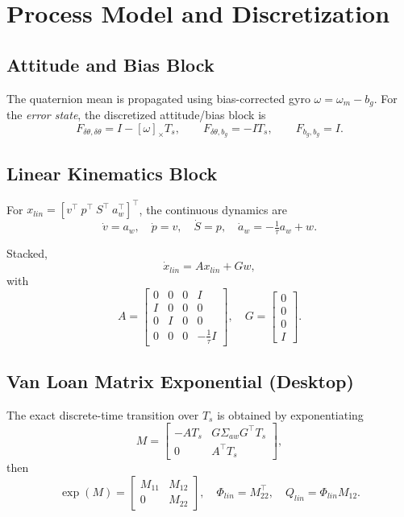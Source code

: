 \documentclass[11pt]{article}
\begin{document}
\section{Process Model and Discretization}

\subsection{Attitude and Bias Block}
The quaternion mean is propagated using bias-corrected gyro $\omega=\omega_m-b_g$.  
For the \emph{error state}, the discretized attitude/bias block is
\[
F_{\delta\theta,\delta\theta} = I - [\omega]_\times T_s,\qquad
F_{\delta\theta,b_g} = -I T_s,\qquad
F_{b_g,b_g}=I.
\]

\subsection{Linear Kinematics Block}
For $x_{lin}=[v^\top\ p^\top\ S^\top\ a_w^\top]^\top$, the continuous dynamics are
\[
\dot v = a_w,\quad \dot p = v,\quad \dot S = p,\quad
\dot a_w = -\tfrac{1}{\tau} a_w + w.
\]

Stacked,
\[
\dot x_{lin} = A x_{lin} + G w,
\]
with
\[
A = \begin{bmatrix}
0 & 0 & 0 & I \\
I & 0 & 0 & 0 \\
0 & I & 0 & 0 \\
0 & 0 & 0 & -\tfrac{1}{\tau} I
\end{bmatrix},\quad
G=\begin{bmatrix}0\\0\\0\\I\end{bmatrix}.
\]

\subsection{Van Loan Matrix Exponential (Desktop)}
The exact discrete-time transition over $T_s$ is obtained by exponentiating
\[
M = \begin{bmatrix}
-AT_s & G\Sigma_{aw}G^\top T_s \\
0 & A^\top T_s
\end{bmatrix},
\]
then
\[
\exp(M) = \begin{bmatrix} M_{11} & M_{12} \\ 0 & M_{22}\end{bmatrix},\quad
\Phi_{lin}=M_{22}^\top,\quad Q_{lin}=\Phi_{lin} M_{12}.
\]
\end{document}
